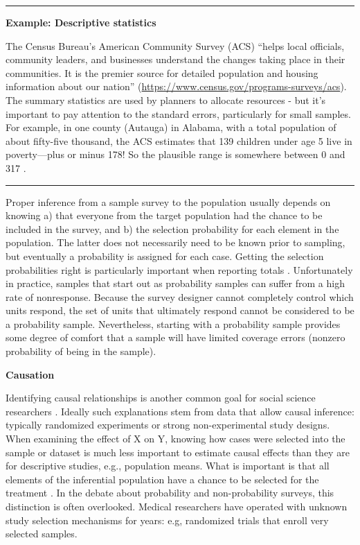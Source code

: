 \documentclass[]{krantz}
\begin{document}
\begin{center}\rule{0.5\linewidth}{\linethickness}\end{center}

\textbf{Example: Descriptive statistics}

The Census Bureau's American Community Survey (ACS) ``helps local
officials, community leaders, and businesses understand the changes
taking place in their communities. It is the premier source for detailed
population and housing information about our nation''
(\url{https://www.census.gov/programs-surveys/acs}). The summary
statistics are used by planners to allocate resources - but it's
important to pay attention to the standard errors, particularly for
small samples. For example, in one county (Autauga) in Alabama, with a
total population of about fifty-five thousand, the ACS estimates that
139 children under age 5 live in poverty---plus or minus 178! So the
plausible range is somewhere between 0 and 317 \citep{Spielman2015}.

\begin{center}\rule{0.5\linewidth}{\linethickness}\end{center}

Proper inference from a sample survey to the population usually depends
on knowing a) that everyone from the target population had the chance to
be included in the survey, and b) the selection probability for each
element in the population. The latter does not necessarily need to be
known prior to sampling, but eventually a probability is assigned for
each case. Getting the selection probabilities right is particularly
important when reporting totals \citep{lohr2009sampling}. Unfortunately
in practice, samples that start out as probability samples can suffer
from a high rate of nonresponse. Because the survey designer cannot
completely control which units respond, the set of units that ultimately
respond cannot be considered to be a probability sample. Nevertheless,
starting with a probability sample provides some degree of comfort that
a sample will have limited coverage errors (nonzero probability of being
in the sample).

\textbf{Causation}

Identifying causal relationships is another common goal for social
science researchers \citep{varian2014big}. Ideally such explanations
stem from data that allow causal inference: typically randomized
experiments or strong non-experimental study designs. When examining the
effect of X on Y, knowing how cases were selected into the sample or
dataset is much less important to estimate causal effects than they are
for descriptive studies, e.g., population means. What is important is
that all elements of the inferential population have a chance to be
selected for the treatment \citep{imbens2015causal}. In the debate about
probability and non-probability surveys, this distinction is often
overlooked. Medical researchers have operated with unknown study
selection mechanisms for years: e.g, randomized trials that enroll very
selected samples.
\end{document}

